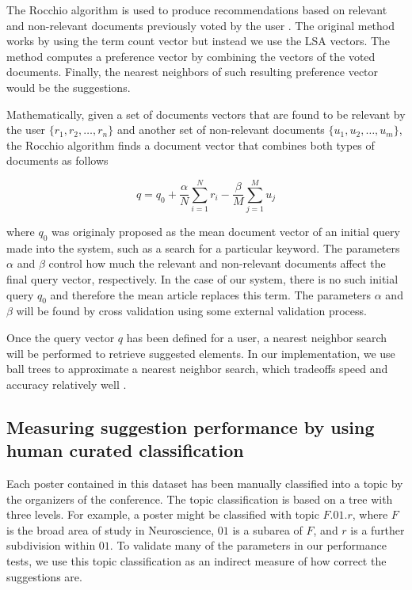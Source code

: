 \documentclass[a4paper]{article}
\begin{document}
The Rocchio algorithm is used to produce recommendations based on relevant and non-relevant documents previously voted by the user \cite{rocchio1971relevance}. The original method works by using the term count vector but instead we use the LSA vectors. The method computes a preference vector by combining the vectors of the voted documents. Finally, the nearest neighbors of such resulting preference vector would be the suggestions.


Mathematically, given a set of documents vectors that are found to be relevant by the user $\{r_1, r_2, \ldots, r_n\}$ and another set of non-relevant documents $\{u_1, u_2, \ldots, u_m\}$, the Rocchio algorithm finds a document vector that combines both types of documents as follows


\begin{equation} \label{eq:1}
 q = q_0 + \frac{\alpha}{N} \sum_{i=1}^N r_i - \frac{\beta}{M} \sum_{j=1}^M u_j
\end{equation}

where $q_0$ was originaly proposed as the mean document vector of an initial query made into the system, such as a search for a particular keyword. The parameters $\alpha$ and $\beta$ control how much the relevant and non-relevant documents affect the final query vector, respectively. In the case of our system, there is no such initial query $q_0$ and therefore the mean article replaces this term. The parameters $\alpha$ and $\beta$ will be found by cross validation using some external validation process.


Once the query vector $q$ has been defined for a user, a nearest neighbor search will be performed to retrieve suggested elements. In our implementation, we use ball trees to approximate a nearest neighbor search, which tradeoffs speed and accuracy relatively well \cite{shakhnarovish2005indyk}.

\subsection{Measuring suggestion performance by using human curated classification}

Each poster contained in this dataset has been manually classified into a topic by the organizers of the conference. The topic classification is based on a tree with three levels. For example, a poster might be classified with topic $F.01.r$, where $F$ is the broad area of study in Neuroscience, $01$ is a subarea of $F$, and $r$ is a further subdivision within $01$.  To validate many of the parameters in our performance tests, we use this topic classification as an indirect measure of how correct the suggestions are.
\end{document}
